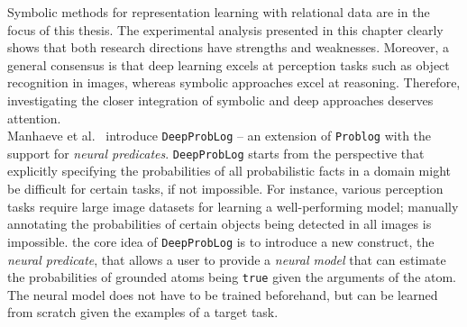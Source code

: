 \begin{tcolorbox}[enhanced,attach boxed title to top center={yshift=-3mm,yshifttext=-1mm}, colback=blue!5!white, colframe=blue!75!black, colbacktitle=white, coltitle=red!25!black,
title=Intermezzo: DeepProbLog,fonttitle=\bfseries, boxed title style={size=small,colframe=blue!75!black} ]

	Symbolic methods for representation learning with relational data are in the focus of this thesis.
	The experimental analysis presented in this chapter clearly shows that both research directions have strengths and weaknesses.
	Moreover, a general consensus is that deep learning excels at perception tasks such as object recognition in images, whereas symbolic approaches excel at reasoning.
	Therefore, investigating the closer integration of symbolic and deep approaches deserves attention. \\


	Manhaeve et al.~\cite{DBLP:journals/corr/abs-1805-10872} introduce \texttt{DeepProbLog} -- an extension of \texttt{Problog} with the support for \textit{neural predicates}.
	\texttt{DeepProbLog} starts from the perspective that explicitly specifying the probabilities of all probabilistic facts in a domain might be difficult for certain tasks, if not impossible.
	For instance, various perception tasks require large image datasets for learning a well-performing model; manually annotating the probabilities of certain objects being detected in all images is impossible.
	the core idea of \texttt{DeepProbLog} is to introduce a new construct, the \textit{neural predicate}, that allows a user to provide a \textit{neural model} that can estimate the probabilities of grounded atoms being \texttt{true} given the arguments of the atom.
	The neural model does not have to be trained beforehand, but can be learned from scratch given the examples of a target task. \\



\end{tcolorbox}
